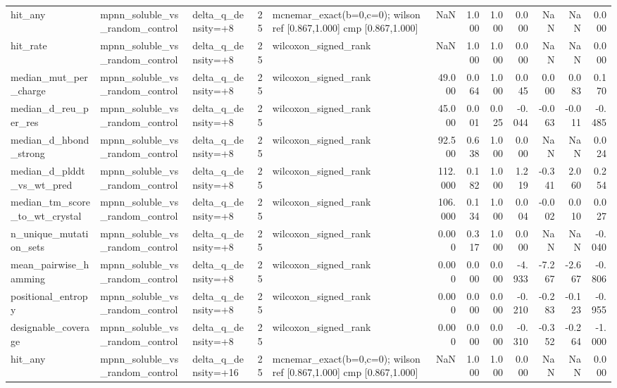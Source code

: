 \begin{table}
{\begin{tabular}{lllrlrrrrrrr}
hit\_any & mpnn\_soluble\_vs\_random\_control & delta\_q\_density=+8 & 25 & mcnemar\_exact(b=0,c=0); wilson ref [0.867,1.000] cmp [0.867,1.000] & NaN & 1.000 & 1.000 & 0.000 & NaN & NaN & 0.000 \\
hit\_rate & mpnn\_soluble\_vs\_random\_control & delta\_q\_density=+8 & 25 & wilcoxon\_signed\_rank & NaN & 1.000 & 1.000 & 0.000 & NaN & NaN & 0.000 \\
median\_mut\_per\_charge & mpnn\_soluble\_vs\_random\_control & delta\_q\_density=+8 & 25 & wilcoxon\_signed\_rank & 49.000 & 0.064 & 1.000 & 0.045 & 0.000 & 0.083 & 0.170 \\
median\_d\_reu\_per\_res & mpnn\_soluble\_vs\_random\_control & delta\_q\_density=+8 & 25 & wilcoxon\_signed\_rank & 45.000 & 0.001 & 0.025 & -0.044 & -0.063 & -0.011 & -0.485 \\
median\_d\_hbond\_strong & mpnn\_soluble\_vs\_random\_control & delta\_q\_density=+8 & 25 & wilcoxon\_signed\_rank & 92.500 & 0.638 & 1.000 & 0.000 & NaN & NaN & 0.024 \\
median\_d\_plddt\_vs\_wt\_pred & mpnn\_soluble\_vs\_random\_control & delta\_q\_density=+8 & 25 & wilcoxon\_signed\_rank & 112.000 & 0.182 & 1.000 & 1.219 & -0.341 & 2.060 & 0.254 \\
median\_tm\_score\_to\_wt\_crystal & mpnn\_soluble\_vs\_random\_control & delta\_q\_density=+8 & 25 & wilcoxon\_signed\_rank & 106.000 & 0.134 & 1.000 & 0.004 & -0.002 & 0.010 & 0.027 \\
n\_unique\_mutation\_sets & mpnn\_soluble\_vs\_random\_control & delta\_q\_density=+8 & 25 & wilcoxon\_signed\_rank & 0.000 & 0.317 & 1.000 & 0.000 & NaN & NaN & -0.040 \\
mean\_pairwise\_hamming & mpnn\_soluble\_vs\_random\_control & delta\_q\_density=+8 & 25 & wilcoxon\_signed\_rank & 0.000 & 0.000 & 0.000 & -4.933 & -7.267 & -2.667 & -0.806 \\
positional\_entropy & mpnn\_soluble\_vs\_random\_control & delta\_q\_density=+8 & 25 & wilcoxon\_signed\_rank & 0.000 & 0.000 & 0.000 & -0.210 & -0.283 & -0.123 & -0.955 \\
designable\_coverage & mpnn\_soluble\_vs\_random\_control & delta\_q\_density=+8 & 25 & wilcoxon\_signed\_rank & 0.000 & 0.000 & 0.000 & -0.310 & -0.352 & -0.264 & -1.000 \\
hit\_any & mpnn\_soluble\_vs\_random\_control & delta\_q\_density=+16 & 25 & mcnemar\_exact(b=0,c=0); wilson ref [0.867,1.000] cmp [0.867,1.000] & NaN & 1.000 & 1.000 & 0.000 & NaN & NaN & 0.000 \\

\end{tabular}}
\end{table}
